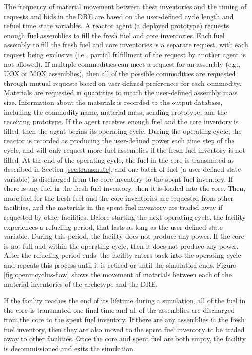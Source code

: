 The frequency of material movement between these inventories and 
the timing of requests and bids in the \gls{DRE} are based on 
the user-defined cycle length and refuel time state variables. 
A reactor agent (a deployed prototype) requests enough fuel assemblies 
to fill the fresh fuel and core inventories.
Each fuel assembly to fill the fresh fuel and core inventories 
is a separate request, with each request 
being exclusive (i.e., partial fulfillment of the request by another 
agent is not allowed). If multiple commodities can meet a request for 
an assembly (e.g., UOX or MOX assemblies), then all of the possible 
commodities are requested through mutual requests based on user-defined 
preferences for each commodity. Materials are requested in quantities 
to match the user-defined assembly mass size. Information about the 
materials is recorded to the output database, including the 
commodity name, material mass, sending prototype, and the receiving 
prototype. If the agent 
receives enough fuel and the core inventory is filled, then the 
agent begins its operating cycle. During the operating cycle, the 
reactor is recorded as producing the user-defined power each time step 
of the cycle, and will only request more fuel assemblies if the 
fresh fuel inventory is not filled. At the end of the operating 
cycle, the fuel in the core is transmuted as described in Section 
\ref{sec:transmute}, and one batch of fuel (a user-defined state variable)
is discharged from the core inventory to the spent fuel inventory. 
If there is any fuel in the fresh fuel inventory, then it is 
loaded into the core. Then, more fuel for the fresh fuel and the 
core inventories are requested from other facilities, and the 
materials in the spent fuel inventory are traded away if requested 
by other facilities. Before starting the next operating cycle, the 
facility experiences a refueling period, that lasts as long as the 
user-defined state variable. During this period, the facility does 
not produce any power. If the core is not full and within the operating 
cycle, then it does not produce any power. After the refueling period 
ends, the facility enters back into the operating cycle and repeats 
this process until it is retired or until the simulation ends. Figure
\ref{fig:openmcyclus-flow} shows the movement of materials 
between each of the material inventories of the archetype and 
the \Cyclus \gls{DRE}. 



If the facility reaches the end of its lifetime during a simulation, 
all of the fuel in 
the core is transmuted one final time and all of the 
assemblies are discharged from the core to the spent fuel
inventory. If there are any assemblies in the fresh fuel inventory, then 
they are also moved to the spent fuel inventory to be traded 
away to other facilities. Once the core and spent fuel are 
both empty, the facility is decommissioned and exits the simulation.


